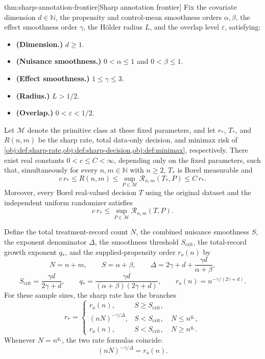 \documentclass[11pt]{article}
\begin{document}
\begin{theoremv}{thm:sharp-annotation-frontier}[Sharp annotation frontier]
Fix the covariate dimension \(d\in\mathbb N\), the propensity and control-mean smoothness orders \(\alpha,\beta\), the effect smoothness order \(\gamma\), the Hölder radius \(L\), and the overlap level \(\varepsilon\), satisfying:
\begin{itemize}
\item \textbf{(Dimension.)} \(d\ge1\).
\item \textbf{(Nuisance smoothness.)} \(0<\alpha\le1\) and \(0<\beta\le1\).
\item \textbf{(Effect smoothness.)} \(1\le\gamma\le3\).
\item \textbf{(Radius.)} \(L>1/2\).
\item \textbf{(Overlap.)} \(0<\varepsilon<1/2\).
\end{itemize}
Let \(\mathcal M\) denote the primitive class at these fixed parameters, and let \(r_*\), \(T_*\), and \(R(n,m)\) be the sharp rate, total data-only decision, and minimax risk of \cref{obj:def:sharp-rate,obj:def:sharp-decision,obj:def:minimax}, respectively. There exist real constants \(0<c\le C<\infty\), depending only on the fixed parameters, such that, simultaneously for every \(n,m\in\mathbb N\) with \(n\ge2\), \(T_*\) is Borel measurable and
\[
c\,r_*
\le R(n,m)
\le \sup_{P\in\mathcal M}\mathcal R_{n,m}(T_*,P)
\le C\,r_*.
\]
Moreover, every Borel real-valued decision \(T\) using the original dataset and the independent uniform randomizer satisfies
\[
c\,r_*\le \sup_{P\in\mathcal M}\mathcal R_{n,m}(T,P).
\]

Define the total treatment-record count \(N\), the combined nuisance smoothness \(S\), the exponent denominator \(\Delta\), the smoothness threshold \(S_{\mathrm{crit}}\), the total-record growth exponent \(q_*\), and the supplied-propensity order \(r_o(n)\) by
\[
N=n+m,\qquad S=\alpha+\beta,\qquad
\Delta=2\gamma+d+\frac{\gamma d}{\alpha+\beta},
\]
\[
S_{\mathrm{crit}}=\frac{\gamma d}{2\gamma+d},
\qquad
q_*=\frac{\gamma d}{(\alpha+\beta)(2\gamma+d)},
\qquad
r_o(n)=n^{-\gamma/(2\gamma+d)}.
\]
For these sample sizes, the sharp rate has the branches
\[
r_*=
\begin{cases}
r_o(n), & S\ge S_{\mathrm{crit}},\\
(nN)^{-\gamma/\Delta}, & S<S_{\mathrm{crit}},\quad N\le n^{q_*},\\
r_o(n), & S<S_{\mathrm{crit}},\quad N\ge n^{q_*}.
\end{cases}
\]
Whenever \(N=n^{q_*}\), the two rate formulas coincide:
\[
(nN)^{-\gamma/\Delta}=r_o(n).
\]
\end{theoremv}
\end{document}
